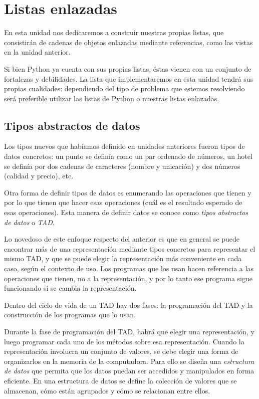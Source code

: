 \chapter{Listas enlazadas}

En esta unidad nos dedicaremos a construir nuestras propias listas, que
consistirán de cadenas de objetos enlazadas mediante referencias, como las
vistas en la unidad anterior.

Si bien Python ya cuenta con sus propias listas, éstas vienen con un conjunto
de fortalezas y debilidades. La lista que implementaremos en esta unidad
tendrá sus propias cualidades: dependiendo del tipo de problema que estemos
resolviendo será preferible utilizar las listas de Python o nuestras listas
enlazadas.

\section{Tipos abstractos de datos}

Los tipos nuevos que habíamos definido en unidades anteriores fueron tipos de
datos concretos: un punto se definía como un par ordenado de números, un hotel
se definía por dos cadenas de caracteres (nombre y unicación) y dos números
(calidad y precio), etc.

Otra forma de definir tipos de datos es enumerando las
operaciones que tienen y por lo que tienen que hacer esas
operaciones (cuál es el resultado esperado de esas operaciones).
Esta manera de definir datos se conoce como \emph{tipos abstractos de datos} o
\emph{TAD}.

Lo novedoso de este enfoque respecto del anterior es que en general se puede
encontrar más de una representación mediante tipos concretos para representar
el mismo TAD, y que se puede elegir la representación más conveniente en cada
caso, según el contexto de uso.
Los programas que los usan hacen referencia a las operaciones que tienen, no a
la representación, y por lo tanto ese programa sigue funcionando si se cambia
la representación.

Dentro del ciclo de vida de un TAD hay dos fases: la programación del TAD y
la construcción de los programas que lo usan.

Durante la fase de programación del TAD, habrá que elegir una
representación, y luego programar cada uno de los métodos sobre esa
representación.
Cuando la representación involucra un conjunto de valores, se debe elegir una
forma de organizarlos en la memoria de la computadora. Para ello se diseña una
\emph{estructura de datos} que permita que los datos puedan ser accedidos y
manipulados en forma eficiente.  En una estructura de datos se define la
colección de valores que se almacenan, cómo están agrupados y cómo se
relacionan entre ellos.

